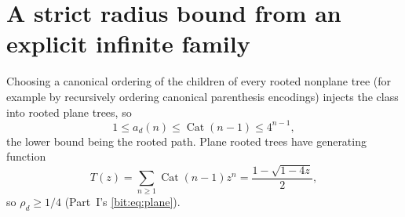 \documentclass[11pt]{article}
\theoremstyle{definition}\newtheorem{definition}[theorem]{Definition}
\theoremstyle{remark}\newtheorem{remark}[theorem]{Remark}
\begin{document}
\section{A strict radius bound from an explicit infinite family}\label{bit:cert:sec:radius}
Choosing a canonical ordering of the children of every rooted nonplane tree
(for example by recursively ordering canonical parenthesis encodings) injects
the class into rooted plane trees, so
\begin{equation}\label{bit:cert:eq:catalan}
 1\le a_d(n)\le\operatorname{Cat}(n-1)\le4^{n-1},
\end{equation}
the lower bound being the rooted path. Plane rooted trees have generating
function
\begin{equation}\label{bit:cert:eq:plane}
 T(z)=\sum_{n\ge1}\operatorname{Cat}(n-1)z^n=\frac{1-\sqrt{1-4z}}2,
\end{equation}
so $\rho_d\ge1/4$ (Part~I's \eqref{bit:eq:plane}).
\end{document}
